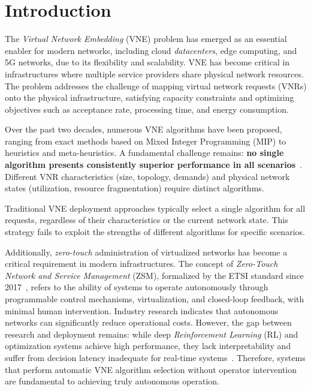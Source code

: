 \documentclass[conference]{IEEEtran}
\begin{document}

\section{Introduction}
\label{sec:Intro}

The \textit{Virtual Network Embedding} (VNE) problem has emerged as an essential enabler for modern networks, including cloud \textit{datacenters}, edge computing, and 5G networks, due to its flexibility and scalability. VNE has become critical in infrastructures where multiple service providers share physical network resources. The problem addresses the challenge of mapping virtual network requests (VNRs) onto the physical infrastructure, satisfying capacity constraints and optimizing objectives such as acceptance rate, processing time, and energy consumption.

Over the past two decades, numerous VNE algorithms have been proposed, ranging from exact methods based on Mixed Integer Programming (MIP) to heuristics and meta-heuristics.
A fundamental challenge remains: \textbf{no single algorithm presents consistently superior performance in all scenarios}~\cite{fischer2013vne-survey}.
Different VNR characteristics (size, topology, demands) and physical network states (utilization, resource fragmentation) require distinct algorithms.

Traditional VNE deployment approaches typically select a single algorithm for all requests, regardless of their characteristics or the current network state. This strategy fails to exploit the strengths of different algorithms for specific scenarios.

Additionally, \textit{zero-touch} administration of virtualized networks has become a critical requirement in modern infrastructures.
The concept of \textit{Zero-Touch Network and Service Management} (ZSM), formalized by the ETSI standard since 2017~\cite{etsi-zsm}, refers to the ability of systems to operate autonomously through programmable control mechanisms, virtualization, and closed-loop feedback, with minimal human intervention.
Industry research indicates that autonomous networks can significantly reduce operational costs.
However, the gap between research and deployment remains: while deep \textit{Reinforcement Learning} (RL) and optimization systems achieve high performance, they lack interpretability and suffer from decision latency inadequate for real-time systems~\cite{white2024zerotough}.
Therefore, systems that perform automatic VNE algorithm selection without operator intervention are fundamental to achieving truly autonomous operation.
\end{document}

